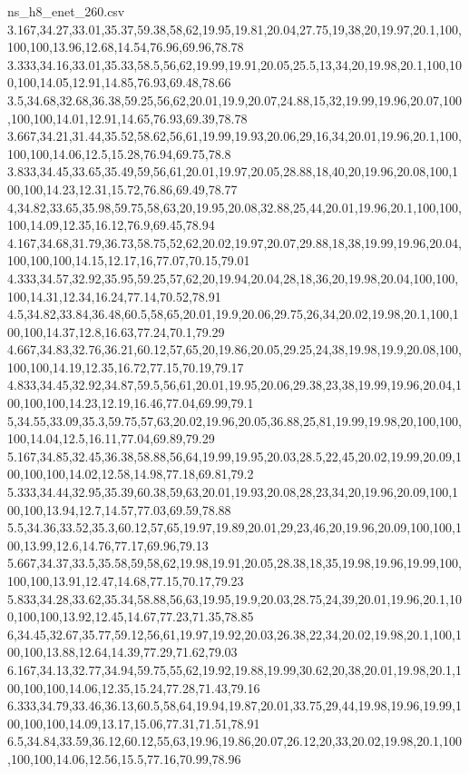 \begin{filecontents*}[overwrite]{ns_h8_enet_260.csv}
3.167,34.27,33.01,35.37,59.38,58,62,19.95,19.81,20.04,27.75,19,38,20,19.97,20.1,100,100,100,13.96,12.68,14.54,76.96,69.96,78.78
3.333,34.16,33.01,35.33,58.5,56,62,19.99,19.91,20.05,25.5,13,34,20,19.98,20.1,100,100,100,14.05,12.91,14.85,76.93,69.48,78.66
3.5,34.68,32.68,36.38,59.25,56,62,20.01,19.9,20.07,24.88,15,32,19.99,19.96,20.07,100,100,100,14.01,12.91,14.65,76.93,69.39,78.78
3.667,34.21,31.44,35.52,58.62,56,61,19.99,19.93,20.06,29,16,34,20.01,19.96,20.1,100,100,100,14.06,12.5,15.28,76.94,69.75,78.8
3.833,34.45,33.65,35.49,59,56,61,20.01,19.97,20.05,28.88,18,40,20,19.96,20.08,100,100,100,14.23,12.31,15.72,76.86,69.49,78.77
4,34.82,33.65,35.98,59.75,58,63,20,19.95,20.08,32.88,25,44,20.01,19.96,20.1,100,100,100,14.09,12.35,16.12,76.9,69.45,78.94
4.167,34.68,31.79,36.73,58.75,52,62,20.02,19.97,20.07,29.88,18,38,19.99,19.96,20.04,100,100,100,14.15,12.17,16,77.07,70.15,79.01
4.333,34.57,32.92,35.95,59.25,57,62,20,19.94,20.04,28,18,36,20,19.98,20.04,100,100,100,14.31,12.34,16.24,77.14,70.52,78.91
4.5,34.82,33.84,36.48,60.5,58,65,20.01,19.9,20.06,29.75,26,34,20.02,19.98,20.1,100,100,100,14.37,12.8,16.63,77.24,70.1,79.29
4.667,34.83,32.76,36.21,60.12,57,65,20,19.86,20.05,29.25,24,38,19.98,19.9,20.08,100,100,100,14.19,12.35,16.72,77.15,70.19,79.17
4.833,34.45,32.92,34.87,59.5,56,61,20.01,19.95,20.06,29.38,23,38,19.99,19.96,20.04,100,100,100,14.23,12.19,16.46,77.04,69.99,79.1
5,34.55,33.09,35.3,59.75,57,63,20.02,19.96,20.05,36.88,25,81,19.99,19.98,20,100,100,100,14.04,12.5,16.11,77.04,69.89,79.29
5.167,34.85,32.45,36.38,58.88,56,64,19.99,19.95,20.03,28.5,22,45,20.02,19.99,20.09,100,100,100,14.02,12.58,14.98,77.18,69.81,79.2
5.333,34.44,32.95,35.39,60.38,59,63,20.01,19.93,20.08,28,23,34,20,19.96,20.09,100,100,100,13.94,12.7,14.57,77.03,69.59,78.88
5.5,34.36,33.52,35.3,60.12,57,65,19.97,19.89,20.01,29,23,46,20,19.96,20.09,100,100,100,13.99,12.6,14.76,77.17,69.96,79.13
5.667,34.37,33.5,35.58,59,58,62,19.98,19.91,20.05,28.38,18,35,19.98,19.96,19.99,100,100,100,13.91,12.47,14.68,77.15,70.17,79.23
5.833,34.28,33.62,35.34,58.88,56,63,19.95,19.9,20.03,28.75,24,39,20.01,19.96,20.1,100,100,100,13.92,12.45,14.67,77.23,71.35,78.85
6,34.45,32.67,35.77,59.12,56,61,19.97,19.92,20.03,26.38,22,34,20.02,19.98,20.1,100,100,100,13.88,12.64,14.39,77.29,71.62,79.03
6.167,34.13,32.77,34.94,59.75,55,62,19.92,19.88,19.99,30.62,20,38,20.01,19.98,20.1,100,100,100,14.06,12.35,15.24,77.28,71.43,79.16
6.333,34.79,33.46,36.13,60.5,58,64,19.94,19.87,20.01,33.75,29,44,19.98,19.96,19.99,100,100,100,14.09,13.17,15.06,77.31,71.51,78.91
6.5,34.84,33.59,36.12,60.12,55,63,19.96,19.86,20.07,26.12,20,33,20.02,19.98,20.1,100,100,100,14.06,12.56,15.5,77.16,70.99,78.96

\end{filecontents*}

